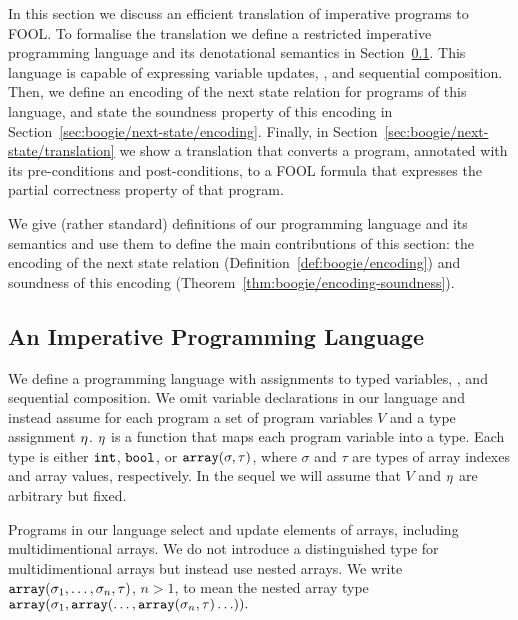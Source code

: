 
In this section we discuss an efficient translation of imperative programs to FOOL. To formalise the translation we define a restricted imperative programming language and its denotational semantics in Section~\ref{sec:boogie/next-state/programming-language}. This language is capable of expressing variable updates, \ITE, and sequential composition. Then, we define an encoding of the next state relation for programs of this language, and state the soundness property of this encoding in Section~\ref{sec:boogie/next-state/encoding}. Finally, in Section~\ref{sec:boogie/next-state/translation} we show a translation that converts a program, annotated with its pre-conditions and post-conditions, to a FOOL formula that expresses the partial correctness property of that program. %

We give (rather standard) definitions of our programming language and its semantics and use them to define the main contributions of this section: the encoding of the next state relation (Definition~\ref{def:boogie/encoding}) and soundness of this encoding (Theorem~\ref{thm:boogie/encoding-soundness}).

\subsection{An Imperative Programming Language}\label{sec:boogie/next-state/programming-language}


We define a programming language with assignments to typed variables, \ITE, and sequential composition. We omit variable declarations in our language and instead assume for each program a set of program variables $V$ and a type assignment $\eta$. $\eta$ is a function that maps each program variable into a type. Each type is either $\mathtt{int}$, $\mathtt{bool}$, or $\mathtt{array}(\sigma,\tau)$, where $\sigma$ and $\tau$ are types of array indexes and array values, respectively. In the sequel we will assume that $V$ and $\eta$ are arbitrary but fixed.

Programs in our language select and update elements of arrays, including multidimentional arrays. We do not introduce a distinguished type for multidimentional arrays but instead use nested arrays. We write $\mathtt{array}(\sigma_1,\ldots,\sigma_n,\tau)$, $n > 1$, to mean the nested array type $\mathtt{array}(\sigma_1,\allowbreak\mathtt{array}(\ldots,\mathtt{array}(\sigma_n,\tau)\ldots)).$

